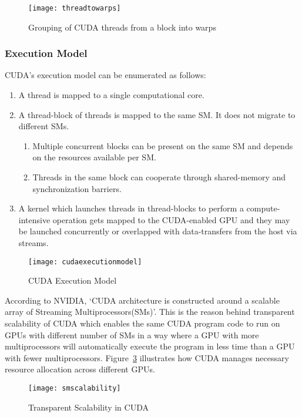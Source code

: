 \documentclass[thesis.tex]{subfiles}
\begin{document}
\begin{figure}[H]
	\centering
	\texttt{[image: threadtowarps]}
	\caption{Grouping of CUDA threads from a block into warps~\cite{profCUDA}}
	\label{fig:threadtowarps}
\end{figure}


\subsubsection{Execution Model}
CUDA’s execution model can be enumerated as follows:
\begin{enumerate}
	\item A thread is mapped to a single computational core.
	\item A thread-block of threads is mapped to the same SM. It does not migrate to different SMs. 
	\begin{enumerate}
		\item Multiple concurrent blocks can be present on the same SM and depends on the resources available per SM.
		\item Threads in the same block can cooperate through shared-memory and synchronization barriers.
	\end{enumerate}
	\item A kernel which launches threads in thread-blocks to perform a compute-intensive operation gets mapped to the CUDA-enabled GPU and they may be launched concurrently or overlapped with data-transfers from the host via streams.
\end{enumerate}

\begin{figure}[H]
	\centering
	\texttt{[image: cudaexecutionmodel]}
	\caption{CUDA Execution Model}
	\label{fig:cudaexecutionmodel}
\end{figure}

According to NVIDIA, ‘CUDA architecture is constructed around a scalable array of Streaming Multiprocessors(SMs)’.  This is the reason behind transparent scalability of CUDA which enables the same CUDA program code to run on GPUs with different number of SMs in a way where a GPU with more multiprocessors will automatically execute the program in less time than a GPU with fewer multiprocessors. Figure~\ref{fig:smscalability} illustrates how CUDA manages necessary resource allocation across different GPUs.

\begin{figure}[H]
	\centering
	\texttt{[image: smscalability]}
	\caption{Transparent Scalability in CUDA~\cite{cuda}}
	\label{fig:smscalability}
\end{figure}
\end{document}
